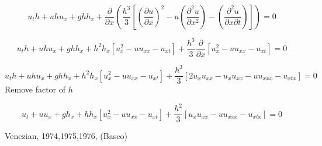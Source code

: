\documentclass[12pt]{article}
\begin{document}
\[u_th  + uhu_x + ghh_x  + \frac{\partial}{\partial x}\left( \frac{h^3}{3}\left[\left(\frac{\partial u}{\partial x} \right)^2 - u \left(\frac{\partial^2 u}{\partial x^2} \right) - \left(\frac{\partial^2 u}{\partial x \partial t} \right)\right]\right)  = 0\]

\[u_th  + uhu_x + ghh_x  + h^2 h_x \left[u_x^2 - uu_{xx} -u_{xt}\right] + \frac{h^3}{3} \frac{\partial}{\partial x}\left[u_x^2 - uu_{xx} -u_{xt}\right]  = 0\]

\[u_th  + uhu_x + ghh_x  + h^2 h_x \left[u_x^2 - uu_{xx} -u_{xt}\right] + \frac{h^3}{3} \left[2u_xu_{xx} -u_xu_{xx} - uu_{xxx} -u_{xtx}\right]  = 0\]
 Remove factor of $h$
 
 \[u_t  + uu_x + gh_x  + h h_x \left[u_x^2 - uu_{xx} -u_{xt}\right] + \frac{h^2}{3} \left[u_xu_{xx} - uu_{xxx} -u_{xtx}\right]  = 0\]
 
Venezian, 1974,1975,1976, (Basco)
\end{document}
